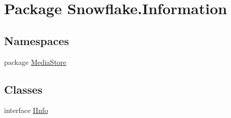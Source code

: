 \hypertarget{namespace_snowflake_1_1_information}{}\section{Package Snowflake.\+Information}
\label{namespace_snowflake_1_1_information}
\subsection*{Namespaces}
\begin{DoxyCompactItemize}
\item 
package \hyperlink{namespace_snowflake_1_1_information_1_1_media_store}{Media\+Store}
\end{DoxyCompactItemize}
\subsection*{Classes}
\begin{DoxyCompactItemize}
\item 
interface \hyperlink{interface_snowflake_1_1_information_1_1_i_info}{I\+Info}
\end{DoxyCompactItemize}
